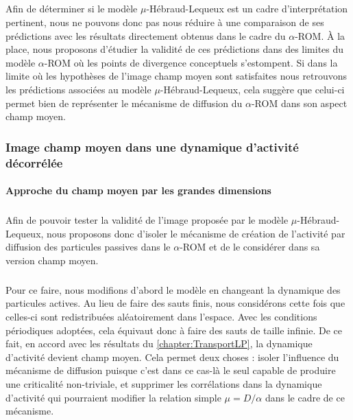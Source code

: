 \subparagraph{}Afin de déterminer si le modèle $\mu$-Hébraud-Lequeux est un cadre d'interprétation pertinent, nous ne pouvons donc pas nous réduire à une comparaison de ses prédictions avec les résultats directement obtenus dans le cadre du $\alpha$-ROM. \`A la place, nous proposons d'étudier la validité de ces prédictions dans des limites du modèle $\alpha$-ROM où les points de divergence conceptuels s'estompent. Si dans la limite où les hypothèses de l'image champ moyen sont satisfaites nous retrouvons les prédictions associées au modèle $\mu$-Hébraud-Lequeux, cela suggère que celui-ci permet bien de représenter le mécanisme de diffusion du $\alpha$-ROM dans son aspect champ moyen.

\subsubsection{Image champ moyen dans une dynamique d'activité décorrélée}

\paragraph{Approche du champ moyen par les grandes dimensions}

\subparagraph{}Afin de pouvoir tester la validité de l'image proposée par le modèle $\mu$-Hébraud-Lequeux, nous proposons donc d'isoler le mécanisme de création de l'activité par diffusion des particules passives dans le $\alpha$-ROM et de le considérer dans sa version champ moyen. 

\subparagraph{}Pour ce faire, nous modifions d'abord le modèle en changeant la dynamique des particules actives. Au lieu de faire des sauts finis, nous considérons cette fois que celles-ci sont redistribuées aléatoirement dans l'espace. Avec les conditions périodiques adoptées, cela équivaut donc à faire des sauts de taille infinie. De ce fait, en accord avec les résultats du \autoref{chapter:TransportLP}, la dynamique d'activité devient champ moyen. Cela permet deux choses : isoler l'influence du mécanisme de diffusion puisque c'est dans ce cas-là le seul capable de produire une criticalité non-triviale, et supprimer les corrélations dans la dynamique d'activité qui pourraient modifier la relation simple $\mu = D/\alpha$ dans le cadre de ce mécanisme.

